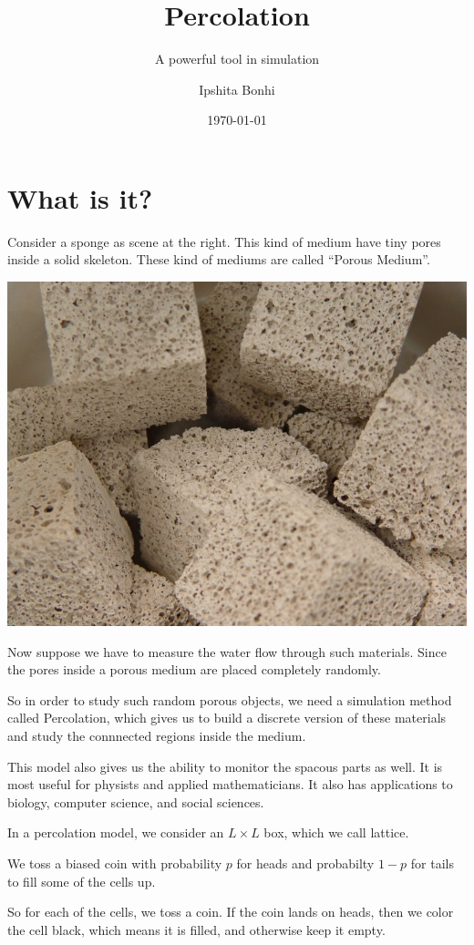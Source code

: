 \documentclass[compress]{beamer}
\title{Percolation}
\subtitle{A powerful tool in simulation}
\author{Ipshita Bonhi}
\date{\today}
\newcommand{\imp}[1]{\textcolor{NordRed}{#1}}
\begin{document}
\begin{frame}
    \maketitle
\end{frame}

\color{NordBlack}

\section{What is it?}


\begin{frame}
    Consider a sponge as scene at the right. This kind of medium have tiny pores
    inside a solid skeleton. These kind of mediums are called ``Porous Medium''.

    \begin{center}
        \includegraphics[width=.4\linewidth]{Porousceramic.jpg}
    \end{center}

    Now suppose we have to measure the water flow through such materials. Since
    the pores inside a porous medium are placed completely randomly. 
\end{frame}

\begin{frame}

    So in order to study such random porous objects, we need a simulation method called
    \imp{Percolation}, which gives us to build a discrete version of these materials and
    study the connnected regions inside the medium.

    \vspace{12pt}

    This model also gives us the ability to monitor the spacous parts as well. It is most
    useful for physists and applied mathematicians. It also has applications to biology,
    computer science, and social sciences.

\end{frame}

\begin{frame}
    In a percolation model, we consider an \(L\times L\) box, which we call \imp{lattice}. 

    \vspace{12pt}
    We toss a biased coin with probability \(p\) for heads and probabilty \(1-p\) for
    tails to fill some of the cells up.

    \vspace{12pt}

    So for each of the cells, we toss a coin. If the coin lands on heads, then we color
    the cell black, which means it is filled, and otherwise keep it empty.
\end{frame}
\end{document}
